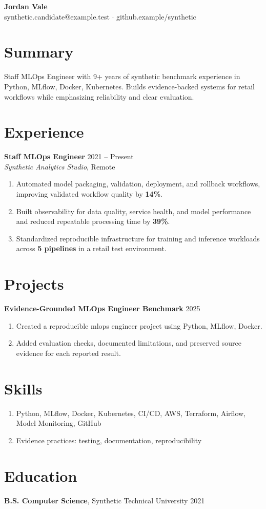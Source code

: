 \documentclass[10pt,letterpaper]{article}
\begin{document}
\begin{center}
{\Large \textbf{Jordan Vale}}\\
synthetic.candidate@example.test $\cdot$ github.example/synthetic
\end{center}

\section*{Summary}
Staff MLOps Engineer with 9+ years of synthetic benchmark experience in Python, MLflow, Docker, Kubernetes. Builds evidence-backed systems for retail workflows while emphasizing reliability and clear evaluation.

\section*{Experience}
\textbf{Staff MLOps Engineer} \hfill 2021 -- Present\\
\textit{Synthetic Analytics Studio}, Remote
\begin{enumerate}
  \item Automated model packaging, validation, deployment, and rollback workflows, improving validated workflow quality by \textbf{14\%}.
  \item Built observability for data quality, service health, and model performance and reduced repeatable processing time by \textbf{39\%}.
  \item Standardized reproducible infrastructure for training and inference workloads across \textbf{5 pipelines} in a retail test environment.
\end{enumerate}

\section*{Projects}
\textbf{Evidence-Grounded MLOps Engineer Benchmark} \hfill 2025
\begin{enumerate}
  \item Created a reproducible mlops engineer project using Python, MLflow, Docker.
  \item Added evaluation checks, documented limitations, and preserved source evidence for each reported result.
\end{enumerate}

\section*{Skills}
\begin{enumerate}
  \item Python, MLflow, Docker, Kubernetes, CI/CD, AWS, Terraform, Airflow, Model Monitoring, GitHub
  \item Evidence practices: testing, documentation, reproducibility
\end{enumerate}

\section*{Education}
\textbf{B.S. Computer Science}, Synthetic Technical University \hfill 2021
\end{document}
